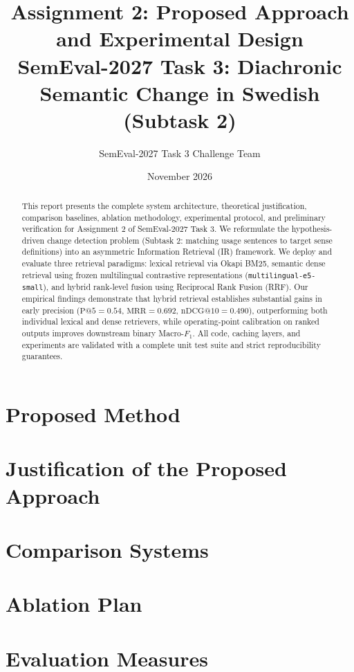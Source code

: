 \documentclass[11pt,a4paper]{article}
\title{\textbf{Assignment 2: Proposed Approach and Experimental Design}\\
\large SemEval-2027 Task 3: Diachronic Semantic Change in Swedish (Subtask 2)}
\author{SemEval-2027 Task 3 Challenge Team}
\date{November 2026}
\begin{document}
\maketitle

\begin{abstract}
This report presents the complete system architecture, theoretical justification, comparison baselines, ablation methodology, experimental protocol, and preliminary verification for Assignment 2 of SemEval-2027 Task 3. We reformulate the hypothesis-driven change detection problem (Subtask 2: matching usage sentences to target sense definitions) into an asymmetric Information Retrieval (IR) framework. We deploy and evaluate three retrieval paradigms: lexical retrieval via Okapi BM25, semantic dense retrieval using frozen multilingual contrastive representations (\texttt{multilingual-e5-small}), and hybrid rank-level fusion using Reciprocal Rank Fusion (RRF). Our empirical findings demonstrate that hybrid retrieval establishes substantial gains in early precision ($\text{P@5} = 0.54$, $\text{MRR} = 0.692$, $\text{nDCG@10} = 0.490$), outperforming both individual lexical and dense retrievers, while operating-point calibration on ranked outputs improves downstream binary Macro-$F_1$. All code, caching layers, and experiments are validated with a complete unit test suite and strict reproducibility guarantees.
\end{abstract}

\section{Proposed Method}


\section{Justification of the Proposed Approach}


\section{Comparison Systems}


\section{Ablation Plan}


\section{Evaluation Measures}

\end{document}
